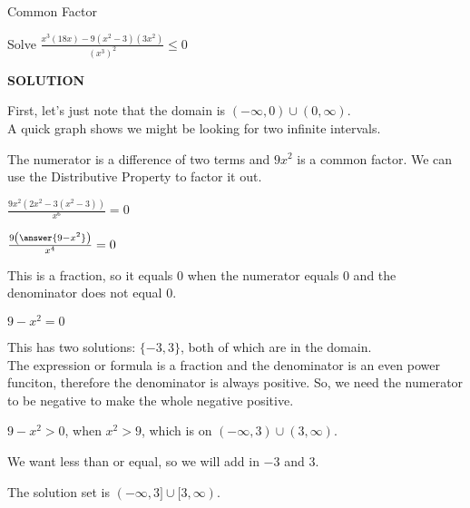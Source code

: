 \documentclass{ximera}
\begin{document}
\begin{example}  Common Factor


Solve $\frac{x^3 (18x) - 9(x^2-3)(3x^2)}{(x^3)^2} \leq 0$



\textbf{\textcolor{purple!50!blue!90!black}{SOLUTION}}

First, let's just note that the domain is $(-\infty, 0) \cup (0, \infty)$. \\

A quick graph shows we might be looking for two infinite intervals.



\begin{center}
\end{center}







The numerator is a difference of two terms and $9 x^2$ is a common factor.  We can use the Distributive Property to factor it out.



$\frac{9x^2 (2x^2 - 3(x^2-3))}{x^6} = 0$


$\frac{9 \left( \answer{9 - x^2} \right)}{x^4} = 0$



This is a fraction, so it equals $0$ when the numerator equals $0$ and the denominator does not equal $0$.


$9 - x^2 = 0$

This has two solutions: $\{ -3, 3  \}$, both of which are in the domain. \\


The expression or formula is a fraction and the denominator is an even power funciton, therefore the denominator is always positive. So, we need the numerator to be negative to make the whole negative positive.


$9 - x^2 > 0$, when $x^2 > 9$, which is on $(-\infty, 3) \cup (3, \infty)$.

We want less than or equal, so we will add in $-3$ and $3$.


The solution set is $(-\infty, 3] \cup [3, \infty)$.


\end{example}
\end{document}
